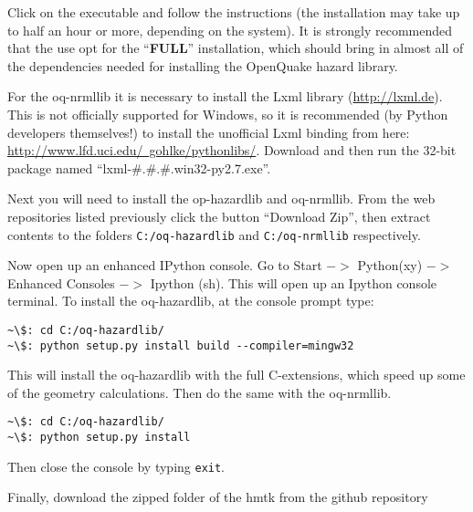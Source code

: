 Click on the executable and follow the instructions (the installation may take up to half an hour or more, depending on the system). It is strongly recommended that the use opt for the ``\textbf{FULL}'' installation, which should bring in almost all of the dependencies needed for installing the OpenQuake hazard library. 

For the oq-nrmllib it is necessary to install the Lxml library (\href{http://lxml.de}{http://lxml.de}). This is not officially supported for Windows, so it is recommended (by Python developers themselves!) to install the unofficial Lxml binding from here: \href{http://www.lfd.uci.edu/~gohlke/pythonlibs/}{http://www.lfd.uci.edu/~gohlke/pythonlibs/}. Download and then run the 32-bit package named ``lxml-\#.\#.\#.win32-py2.7.exe''.

Next you will need to install the op-hazardlib and oq-nrmllib. From the web repositories listed previously click the button ``Download Zip'', then extract contents to the folders \verb=C:/oq-hazardlib= and \verb=C:/oq-nrmllib= respectively.

Now open up an enhanced IPython console. Go to Start $->$ Python(xy) $->$ Enhanced Consoles $->$ Ipython (sh). This will open up an Ipython console terminal. To install the oq-hazardlib, at the console prompt type:

\begin{Verbatim}[frame=single, commandchars=\\\{\}, fontsize=\scriptsize]
~\$: cd C:/oq-hazardlib/
~\$: python setup.py install build --compiler=mingw32
\end{Verbatim}

This will install the oq-hazardlib with the full C-extensions, which speed up some of the geometry calculations. Then do the same with the oq-nrmllib.

\begin{Verbatim}[frame=single, commandchars=\\\{\}, fontsize=\scriptsize]
~\$: cd C:/oq-hazardlib/
~\$: python setup.py install
\end{Verbatim}

Then close the console by typing \verb=exit=. 

Finally, download the zipped folder of the hmtk from the github repository 









